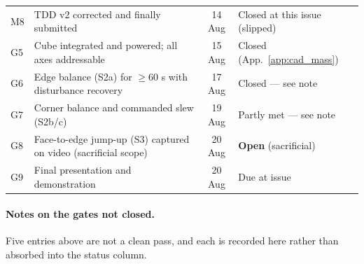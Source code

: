 \begin{table}[htbp]
\begin{tabular}{@{}l L{6.3cm} c L{3.6cm}@{}}
M8 & TDD v2 corrected and finally submitted & 14 Aug & Closed at this issue (slipped) \\
G5 & Cube integrated and powered; all axes addressable & 15 Aug & Closed (App.~\ref{app:cad_mass}) \\
G6 & Edge balance (S2a) for $\geq$60 s with disturbance recovery & 17 Aug & Closed --- see note \\
G7 & Corner balance and commanded slew (S2b/c) & 19 Aug & Partly met --- see note \\
G8 & Face-to-edge jump-up (S3) captured on video (sacrificial scope) & 20 Aug & \textbf{Open} (sacrificial) \\
G9 & Final presentation and demonstration & 20 Aug & Due at issue \\
\bottomrule
\end{tabular}
\end{table}

\paragraph{Notes on the gates not closed.} Five entries above are not a clean
pass, and each is recorded here rather than absorbed into the status column.

